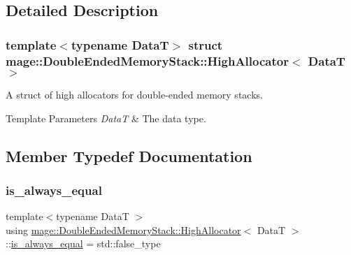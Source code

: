 \subsection{Detailed Description}
\subsubsection*{template$<$typename DataT$>$\newline
struct mage\+::\+Double\+Ended\+Memory\+Stack\+::\+High\+Allocator$<$ Data\+T $>$}

A struct of high allocators for double-\/ended memory stacks.


\begin{DoxyTemplParams}{Template Parameters}
{\em DataT} & The data type. \\
\hline
\end{DoxyTemplParams}


\subsection{Member Typedef Documentation}
\hypertarget{structmage_1_1_double_ended_memory_stack_1_1_high_allocator_af6ec362496ffae52532f1bb57170edf7}{}\label{structmage_1_1_double_ended_memory_stack_1_1_high_allocator_af6ec362496ffae52532f1bb57170edf7} 
\subsubsection{\texorpdfstring{is\+\_\+always\+\_\+equal}{is\_always\_equal}}
{\footnotesize\ttfamily template$<$typename DataT $>$ \\
using \hyperlink{structmage_1_1_double_ended_memory_stack_1_1_high_allocator}{mage\+::\+Double\+Ended\+Memory\+Stack\+::\+High\+Allocator}$<$ DataT $>$\+::\hyperlink{structmage_1_1_double_ended_memory_stack_1_1_high_allocator_af6ec362496ffae52532f1bb57170edf7}{is\+\_\+always\+\_\+equal} =  std\+::false\+\_\+type}

\hypertarget{structmage_1_1_double_ended_memory_stack_1_1_high_allocator_a62088aeffb56b35539d9080aabc43134}{}\label{structmage_1_1_double_ended_memory_stack_1_1_high_allocator_a62088aeffb56b35539d9080aabc43134} 
